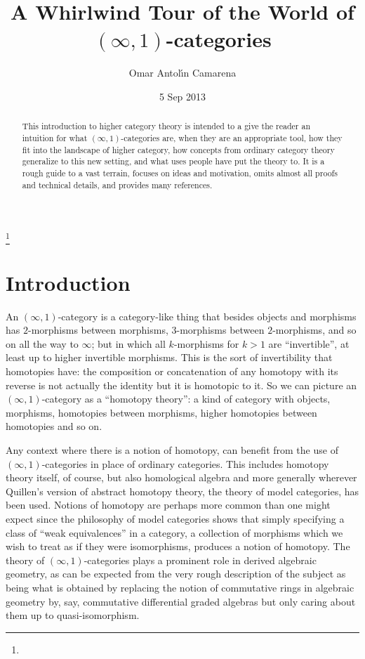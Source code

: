 \documentclass[12pt]{amsart}
\theoremstyle{definition} \newtheorem{definition}[theorem]{Definition}
\theoremstyle{remark} \newtheorem{remark}[theorem]{Remark}
\numberwithin{equation}{section}
\newcommand{\oo}{\infty}
\newcommand{\io}{$(\oo,1)$}
\begin{document}
\title[Whirlwind Tour of $(\infty,1)$-categories]{A Whirlwind Tour of
the World of $(\infty,1)$-categories}

\author{Omar Antol\'{\i}n Camarena} \address{} \curraddr{}
 \thanks{}


\date{5 Sep 2013}

\begin{abstract}
  This introduction to higher category theory is intended to a give
  the reader an intuition for what \io-categories are, when they are
  an appropriate tool, how they fit into the landscape of higher
  category, how concepts from ordinary category theory generalize to
  this new setting, and what uses people have put the theory to. It is
  a rough guide to a vast terrain, focuses on ideas and motivation,
  omits almost all proofs and technical details, and provides many
  references.
\end{abstract}

\maketitle

\section{Introduction}

An \io-category is a category-like thing that besides objects and
morphisms has $2$-morphisms between morphisms, $3$-morphisms between
$2$-morphisms, and so on all the way to $\oo$; but in which all
$k$-morphisms for $k>1$ are ``invertible'', at least up to higher
invertible morphisms. This is the sort of invertibility that
homotopies have: the composition or concatenation of any homotopy with
its reverse is not actually the identity but it is homotopic to it. So
we can picture an \io-category as a ``homotopy theory'': a kind of
category with objects, morphisms, homotopies between morphisms, higher
homotopies between homotopies and so on.

Any context where there is a notion of homotopy, can benefit from the
use of \io-categories in place of ordinary categories. This includes
homotopy theory itself, of course, but also homological algebra and
more generally wherever Quillen's version of abstract homotopy theory,
the theory of model categories, has been used. Notions of homotopy are
perhaps more common than one might expect since the philosophy of
model categories shows that simply specifying a class of ``weak
equivalences'' in a category, a collection of morphisms which we wish
to treat as if they were isomorphisms, produces a notion of homotopy.
The theory of \io-categories plays a prominent role in derived
algebraic geometry, as can be expected from the very rough description
of the subject as being what is obtained by replacing the notion of
commutative rings in algebraic geometry by, say, commutative
differential graded algebras but only caring about them up to
quasi-isomorphism.
\end{document}
